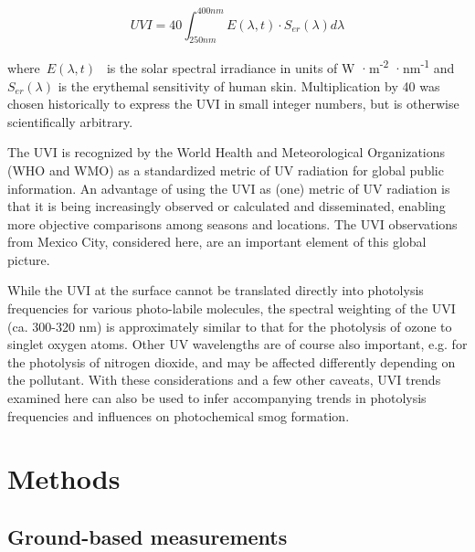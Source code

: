 \documentclass[journal=jacsat,manuscript=article]{achemso}
\begin{document}
\begin{equation}
  \label{eq:UVI}
  UVI=40 \int_{250nm}^{400nm} E\left(\lambda,t\right) \cdot S_{er}(\lambda) d\lambda
\end{equation}

where~\(E(\lambda,t)\)\emph{~} is the solar spectral irradiance in
units of W ·m\textsuperscript{-2} ·nm\textsuperscript{-1}
and~\(S_{er}\left(\lambda\right)\) is the erythemal sensitivity of human
skin.\citep{who2002,Webb_2011}
Multiplication by 40 was chosen historically to
express the UVI in small integer numbers, but is otherwise
scientifically arbitrary.

The UVI is recognized by the World Health and Meteorological
Organizations (WHO and WMO) as a standardized metric of UV
radiation\cite{who2002} for global public information. An advantage
of using the UVI as (one) metric of UV radiation is that it is being
increasingly observed or calculated and disseminated, enabling more
objective comparisons among seasons and locations. The UVI observations
from Mexico City, considered here, are an important element of this
global picture.

While the UVI at the surface cannot be translated directly into
photolysis frequencies for various photo-labile molecules, the spectral
weighting of the UVI (ca. 300-320 nm) is approximately similar to that
for the photolysis of ozone to singlet oxygen atoms. Other UV
wavelengths are of course also important, e.g. for the photolysis of
nitrogen dioxide, and may be affected differently depending on the
pollutant. With these considerations and a few other caveats, UVI trends
examined here can also be used to infer accompanying trends in
photolysis frequencies and influences on photochemical smog formation.




\section{Methods}
\label{sec:methods}

\subsection{Ground-based measurements}
\end{document}

